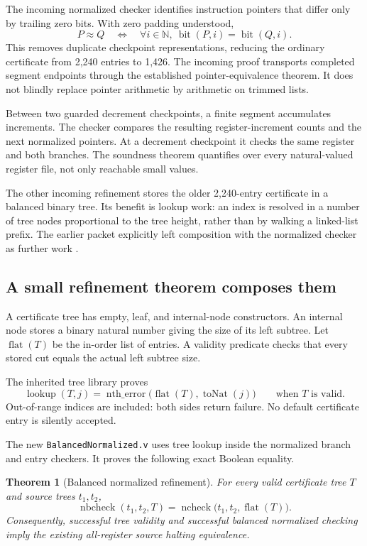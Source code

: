 \documentclass[11pt]{article}
\newcommand{\code}[1]{\texttt{#1}}
\newtheorem{theorem}{Theorem}[section]
\theoremstyle{remark}
\begin{document}
The incoming normalized checker identifies instruction pointers that differ
only by trailing zero bits. With zero padding understood,
\[
P\approx Q
\quad\Longleftrightarrow\quad
\forall i\in\mathbb N,\ \operatorname{bit}(P,i)=\operatorname{bit}(Q,i).
\]
This removes duplicate checkpoint representations, reducing the ordinary
certificate from 2,240 entries to 1,426. The incoming proof transports
completed segment endpoints through the established pointer-equivalence
theorem. It does not blindly replace pointer arithmetic by arithmetic on
trimmed lists.

Between two guarded decrement checkpoints, a finite segment accumulates
increments. The checker compares the resulting register-increment counts
and the next normalized pointers. At a decrement checkpoint it checks the
same register and both branches. The soundness theorem quantifies over every
natural-valued register file, not only reachable small values.

The other incoming refinement stores the older 2,240-entry certificate in a
balanced binary tree. Its benefit is lookup work: an index is resolved in a
number of tree nodes proportional to the tree height, rather than by walking
a linked-list prefix. The earlier packet explicitly left composition with
the normalized checker as further work \cite{refinements}.

\subsection{A small refinement theorem composes them}

A certificate tree has empty, leaf, and internal-node constructors. An
internal node stores a binary natural number giving the size of its left
subtree. Let \(\operatorname{flat}(T)\) be the in-order list of entries.
A validity predicate checks that every stored cut equals the actual left
subtree size.

The inherited tree library proves
\[
\operatorname{lookup}(T,j)
=
\operatorname{nth\_error}\bigl(\operatorname{flat}(T),\operatorname{toNat}(j)\bigr)
\qquad\text{when }T\text{ is valid}.
\]
Out-of-range indices are included: both sides return failure. No default
certificate entry is silently accepted.

The new \code{BalancedNormalized.v} uses tree lookup inside the normalized
branch and entry checkers. It proves the following exact Boolean equality.

\begin{theorem}[Balanced normalized refinement]
For every valid certificate tree \(T\) and source trees \(t_1,t_2\),
\[
\operatorname{nbcheck}(t_1,t_2,T)
=
\operatorname{ncheck}\bigl(t_1,t_2,\operatorname{flat}(T)\bigr).
\]
Consequently, successful tree validity and successful balanced normalized
checking imply the existing all-register source halting equivalence.
\end{theorem}
\end{document}
